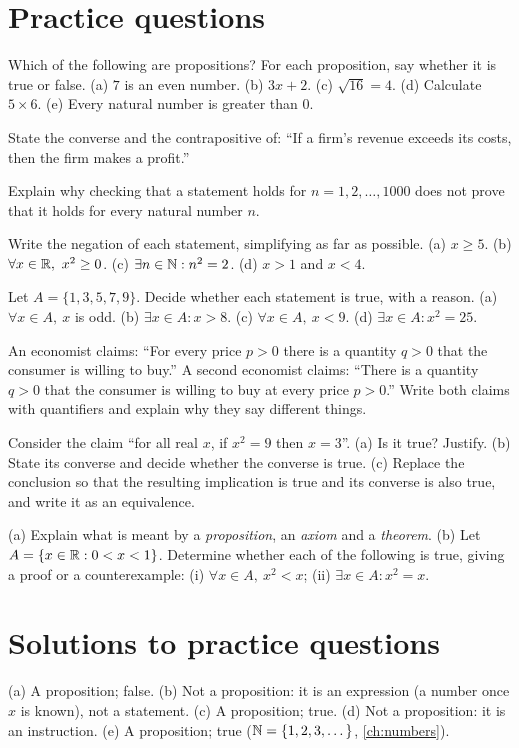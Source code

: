 \section{Practice questions}
\pq[basic] Which of the following are propositions? For each proposition, say whether it is true or false.
(a) $7$ is an even number. (b) $3x+2$. (c) $\sqrt{16}=4$. (d) Calculate $5\times 6$.
(e) Every natural number is greater than $0$.

\pq[basic] State the converse and the contrapositive of: ``If a firm's revenue exceeds its costs, then the
firm makes a profit.''

\pq[conceptual] Explain why checking that a statement holds for $n=1,2,\dots,1000$ does not prove that it
holds for every natural number $n$.

\pq[mathematical] Write the negation of each statement, simplifying as far as possible.
(a) $x\ge 5$. (b) $\forall x\in\mathbb{R},\ x^2\ge 0$. (c) $\exists n\in\mathbb{N}: n^2=2$.
(d) $x>1$ and $x<4$.

\pq[mathematical] Let $A=\{1,3,5,7,9\}$. Decide whether each statement is true, with a reason.
(a) $\forall x\in A,\ x$ is odd. (b) $\exists x\in A: x>8$. (c) $\forall x\in A,\ x<9$.
(d) $\exists x\in A: x^2=25$.

\pq[application] An economist claims: ``For every price $p>0$ there is a quantity $q>0$ that the consumer
is willing to buy.'' A second economist claims: ``There is a quantity $q>0$ that the consumer is willing to
buy at every price $p>0$.'' Write both claims with quantifiers and explain why they say different things.

 Consider the claim ``for all real $x$, if $x^2=9$ then $x=3$''. (a) Is it true? Justify.
(b) State its converse and decide whether the converse is true. (c) Replace the conclusion so that the
resulting implication is true and its converse is also true, and write it as an equivalence.

 (a) Explain what is meant by a \emph{proposition}, an \emph{axiom} and a \emph{theorem}.
(b) Let $A=\{x\in\mathbb{R}: 0<x<1\}$. Determine whether each of the following is true, giving a proof or a
counterexample: (i) $\forall x\in A,\ x^2<x$; (ii) $\exists x\in A: x^2=x$.

\section{Solutions to practice questions}
(a) A proposition; false. (b) Not a proposition: it is an expression (a number once $x$ is known), not a
statement. (c) A proposition; true. (d) Not a proposition: it is an instruction. (e) A proposition; true
($\mathbb{N}=\{1,2,3,\dots\}$, \cref{ch:numbers}).

